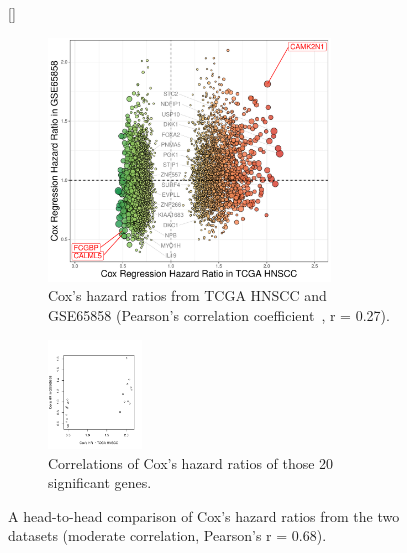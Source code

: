 \documentclass[
paper=landscape,
paper=160mm:90mm, %
fontsize=11pt, %
pagesize, %
parskip=half-, %
]{scrartcl} %
\theoremstyle{mythmstyle} %
\begin{document}
\begin{figure}[ht]

[\FBwidth]
{%
    
    \begin{subfigure}[c]{0.5\textwidth}
    \includegraphics[width=7.5cm]{RplotH2H_TCGA_GSE65858_CoxHR.pdf}
    \caption{Cox's hazard ratios from TCGA HNSCC and GSE65858 (Pearson's correlation coefficient~\cite{Schober2018}, r = 0.27).}
    \end{subfigure}
    \begin{subfigure}[t]{0.15\textwidth}
    \includegraphics[width=2.5cm]{Rplot20_correlation_TCGA_GSE65858_CoxHR.pdf}
    \caption{Correlations of Cox's hazard ratios of those 20 significant genes.}%
    \end{subfigure}    
}   
{\captionsetup{labelformat=empty}    \caption{A head-to-head comparison of Cox's hazard ratios from the two datasets (moderate correlation, Pearson's r = 0.68).
    }}
\end{figure}
\end{document}
